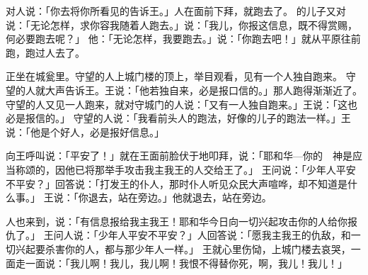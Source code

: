 {对{}人说：「你去将你所看见的告诉王。」{}人在{}面前下拜，就跑去了。
的儿子{}又对{}说：「无论怎样，求你容我随着{}人跑去。」{}说：「我儿，你报这信息，既不得赏赐，何必要跑去呢？」
他{}：「无论怎样，我要跑去。」{}说：「你跑去吧！」{}就从平原往前跑，跑过{}人去了。
\par }{\PP {}正坐在城瓮里。守望的人上城门楼的顶上，举目观看，见有一个人独自跑来。
守望的人就大声告诉王。王说：「他若独自来，必是报口信的。」那人跑得渐渐近了。
守望的人又见一人跑来，就对守城门的人说：「又有一人独自跑来。」王说：「这也必是报信的。」
守望的人说：「我看前头人的跑法，好像{}的儿子{}的跑法一样。」王说：「他是个好人，必是报好信息。」
\par }{\PP {}向王呼叫说：「平安了！」就在王面前脸伏于地叩拜，说：「耶和华—你的　神是应当称颂的，因他已将那举手攻击我主我王的人交给王了。」
王问说：「少年人{}平安不平安？」{}回答说：「{}打发王的仆人，那时仆人听见众民大声喧哗，却不知道是什么事。」
王说：「你退去，站在旁边。」他就退去，站在旁边。
\par }{\PP {}人也来到，说：「有信息报给我主我王！耶和华今日向一切兴起攻击你的人给你报仇了。」
王问{}人说：「少年人{}平安不平安？」{}人回答说：「愿我主我王的仇敌，和一切兴起要杀害你的人，都与那少年人一样。」
王就心里伤恸，上城门楼去哀哭，一面走一面说：「我儿{}啊！我儿，我儿{}啊！我恨不得替你死，{}啊，我儿！我儿！」

}
